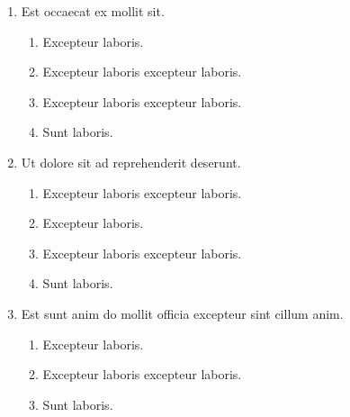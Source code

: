 \documentclass[a4paper,12pt]{article}
\begin{document}
\begin{enumerate}[label=\textbf{\arabic*.}]
\begin{multicols}{2}
\begin{enumerate}
		\item  13pt
    
		\item  15pt
    
		\item  12pt
    
	\end{enumerate}

\end{multicols}
\item Est occaecat ex mollit sit.
\begin{multicols}{2}
	\begin{enumerate}
		\item  Excepteur laboris.
    
		\item  Excepteur laboris excepteur laboris.
    
		\item  Excepteur laboris excepteur laboris.
  
		\item  Sunt laboris.
    
	\end{enumerate}

\end{multicols}
\item Ut dolore sit ad reprehenderit deserunt.
\begin{multicols}{2}
	\begin{enumerate}
		\item  Excepteur laboris excepteur laboris.
    
		\item  Excepteur laboris.
    
		\item  Excepteur laboris excepteur laboris.
  
		\item  Sunt laboris.
    
	\end{enumerate}

\end{multicols}
\item Est sunt anim do mollit officia excepteur sint cillum anim.
\begin{multicols}{2}
	\begin{enumerate}
		\item  Excepteur laboris.
    
		\item  Excepteur laboris excepteur laboris.
    
		\item  Sunt laboris.
    

\end{enumerate}
\end{multicols}
\end{enumerate}
\end{document}
